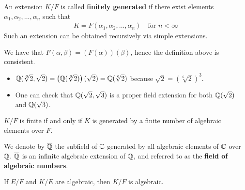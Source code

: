 \documentclass{memoir}
\begin{document}
\begin{defn}
	An extension \(K / F\) is called \textbf{finitely generated} if there exist elements \(\alpha_1, \alpha_2,\ldots,\alpha_n\) such that
	\begin{align*}
		K = F(\alpha_1, \alpha_2, \ldots, \alpha_n) \quad \text{for }n<\infty
	\end{align*}
	Such an extension can be obtained recursively via simple extensions.
\end{defn}
	We have that \(F(\alpha ,\beta ) = (F(\alpha ))(\beta )\), hence the definition above is consistent.
\begin{exmp}
	\begin{itemize}
		\item \(\mathbb{Q}(\sqrt[6]{2} ,\sqrt{2} ) = \left( \mathbb{Q}(\sqrt[6]{2} ) \right) (\sqrt{2} ) = \mathbb{Q}(\sqrt[6]{2} )\) because \(\sqrt{2} = (\sqrt[6]{2} )^3\).
		\item One can check that \(\mathbb{Q}(\sqrt{2} ,\sqrt{3} )\) is a proper field extension for both \(\mathbb{Q}(\sqrt{2} )\) and \(\mathbb{Q}(\sqrt{3} )\).
	\end{itemize}
\end{exmp}
\begin{thm}
	\(K / F\) is finite if and only if \(K\) is generated by a finite number of algebraic elements over \(F\).
\end{thm}
We denote by \(\overline{\mathbb{Q}}\) the subfield of \(\mathbb{C}\) generated by all algebraic elements of \(\mathbb{C}\) over \(\mathbb{Q}\). \(\overline{\mathbb{Q}}\) is an infinite algebraic extension of \(\mathbb{Q}\), and referred to as the \textbf{field of algebraic numbers}. \\

\begin{thm}
	If \(E / F\) and \(K / E\) are algebraic, then \(K / F\) is algebraic.
\end{thm}
\end{document}
